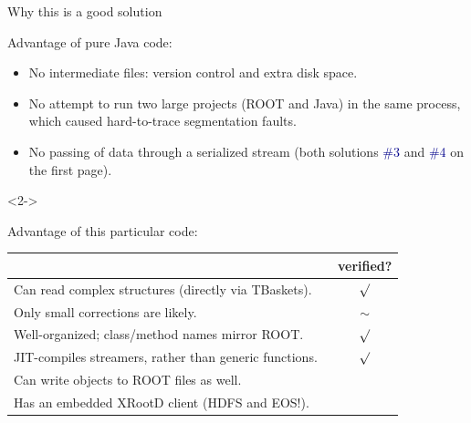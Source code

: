 \documentclass{beamer}
\begin{document}
\begin{frame}{Why this is a good solution}
\vspace{0.3 cm}
\begin{block}{Advantage of pure Java code:}
\begin{itemize}
\item No intermediate files: version control and extra disk space.
\item No attempt to run two large projects (ROOT and Java) in the same process, which caused hard-to-trace segmentation faults.
\item No passing of data through a serialized stream (both solutions \textcolor{darkblue}{\#3} and \textcolor{darkblue}{\#4} on the first page).
\end{itemize}
\end{block}

\vspace{-0.5 cm}
\begin{uncoverenv}<2->
\begin{block}{Advantage of this particular code:\vspace{-0.5 cm}}
\renewcommand{\arraystretch}{1.2}
\begin{tabular}{p{0.85\linewidth} c}
& verified? \\\hline
Can read complex structures (directly via TBaskets). & $\surd$ \\
Only small corrections are likely. & $\sim$ \\
Well-organized; class/method names mirror ROOT. & $\surd$ \\
JIT-compiles streamers, rather than generic functions. & $\surd$ \\
Can write objects to ROOT files as well. & \\
Has an embedded XRootD client (HDFS and EOS!). & \\
\end{tabular}
\end{block}
\end{uncoverenv}
\end{frame}
\end{document}
